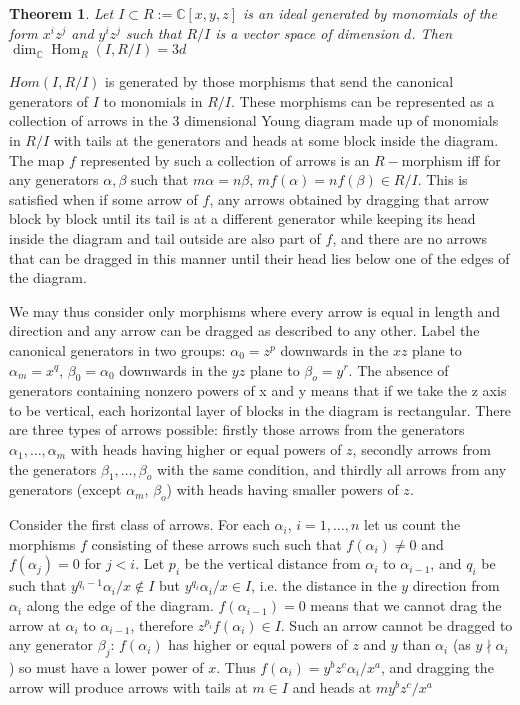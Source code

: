 \documentclass[a4paper,12pt,titlepage]{article}
\newcommand{\C}{\mathbb{C}}
\DeclareMathOperator{\Hom}{Hom}
\newtheorem{thm}{Theorem}
\begin{document}
\begin{thm} Let $I \subset R := \C[x,y,z]$ is an ideal generated by monomials of the form $x^iz^j$ and $y^iz^j$
such that $R/I$ is a vector space of dimension $d$. Then $\dim_\C \Hom_R(I,R/I)=3d$
\end{thm}
$Hom(I,R/I)$ is generated by those morphisms that send the canonical generators of $I$ to monomials in $R/I$.
These morphisms can be represented as a collection of arrows in the 3 dimensional Young diagram made up of monomials in $R/I$ with tails at the generators and heads at some block inside the diagram.
The map $f$ represented by such a collection of arrows is an $R-$morphism iff for any generators $\alpha,\beta$ such that $m\alpha=n\beta$, $mf(\alpha)=nf(\beta) \in R/I$.
This is satisfied when if some arrow of $f$, any arrows obtained by dragging that arrow block by block until its tail is at a different generator
while keeping its head inside the diagram and tail outside are also part of $f$, and there are no arrows that
can be dragged in this manner until their head lies below one of the edges of the diagram.

We may thus consider only morphisms where every arrow is equal in length and direction and any arrow can be dragged as described to any other.
Label the canonical generators in two groups: $\alpha_0=z^p$ downwards in the $xz$ plane to $\alpha_m=x^q$, $\beta_0=\alpha_0$ downwards in the $yz$ plane to $\beta_o=y^r$. 
The absence of generators containing nonzero powers of x and y means that if we take the z axis to be vertical, each horizontal layer of blocks in the diagram is rectangular.
There are three types of arrows possible: firstly those arrows from the generators $\alpha_1, \dots, \alpha_m$ with heads having higher or equal powers of $z$, secondly arrows from the generators $\beta_1, \dots, \beta_o$ with the same condition, and thirdly all arrows from any generators (except $\alpha_m$, $\beta_o$) with heads having smaller powers of $z$.

Consider the first class of arrows.
For each $\alpha_i$, $i=1, \dots, n$ let us count the morphisms $f$ consisting of these arrows such such that $f(\alpha_i) \neq 0$ and $f(\alpha_j)=0$ for $j<i$.
Let $p_i$ be the vertical distance from $\alpha_i$ to $\alpha_{i-1}$, and $q_i$ be such that $y^{q_i-1}\alpha_i/x \notin I$ but $y^{q_i}\alpha_i/x \in I$,
i.e. the distance in the $y$ direction from $\alpha_i$ along the edge of the diagram. $f(\alpha_{i-1})=0$ means that we cannot drag the arrow at $\alpha_i$ to $\alpha_{i-1}$,
therefore $z^{p_i}f(\alpha_i) \in I$. Such an arrow cannot be dragged to any generator $\beta_j$: 
$f(\alpha_i)$ has higher or equal powers of $z$ and $y$ than $\alpha_i$ (as $y \nmid \alpha_i$) so must have a lower power of $x$. Thus $f(\alpha_i)=y^bz^c\alpha_i/x^a$,
and dragging the arrow will produce arrows with tails at $m \in I$ and heads at $my^bz^c/x^a$
\end{document}
